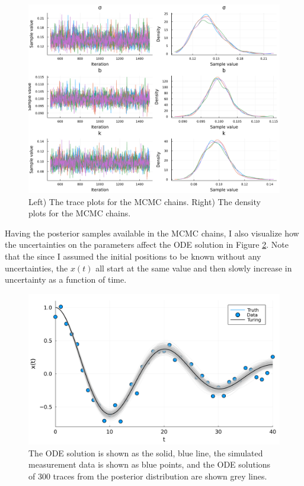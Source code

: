 \documentclass[10pt,a4paper]{article}
\begin{document}
\begin{figure}[H]
    \includegraphics[width=\linewidth]{turing_chains.pdf}
    \caption{Left) The trace plots for the MCMC chains. Right) The density plots for the MCMC chains.}
    \label{fig:MCMC_chains}
\end{figure}

Having the posterior samples available in the MCMC chains, I also visualize how the
uncertainties on the parameters affect the ODE solution in Figure \ref{fig:MCMC}.
Note that the since I assumed the initial positions to be known without any
uncertainties, the $x(t)$ all start at the same value and then slowly increase in uncertainty
as a function of time.

\begin{figure}[H]
    \includegraphics[width=\linewidth]{turing.pdf}
    \caption{The ODE solution is shown as the solid, blue line,
        the simulated measurement data is shown as blue points,
        and the ODE solutions of 300 traces from the posterior distribution are shown grey lines.}
    \label{fig:MCMC}
\end{figure}
\end{document}
